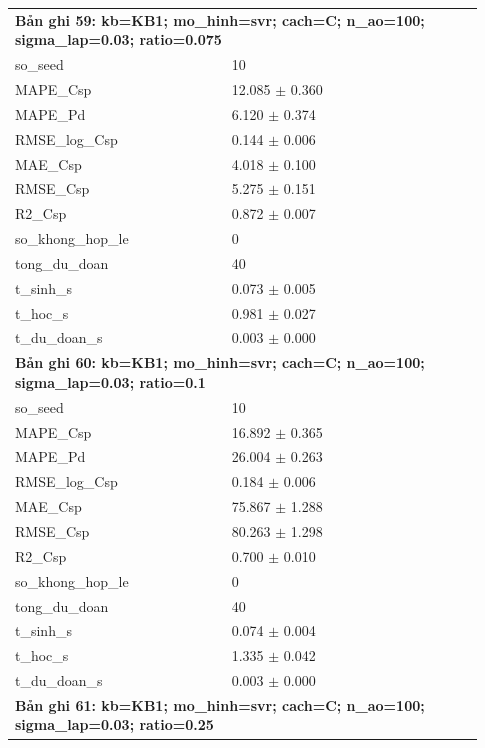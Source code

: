\begin{longtable}{p{0.43\linewidth}p{0.50\linewidth}}
\midrule
\multicolumn{2}{p{0.95\linewidth}}{\textbf{Bản ghi 59: kb=KB1; mo\_hinh=svr; cach=C; n\_ao=100; sigma\_lap=0.03; ratio=0.075}} \\
so\_\allowbreak seed & 10 \\
MAPE\_\allowbreak Csp & 12.085 $\pm$ 0.360 \\
MAPE\_\allowbreak Pd & 6.120 $\pm$ 0.374 \\
RMSE\_\allowbreak log\_\allowbreak Csp & 0.144 $\pm$ 0.006 \\
MAE\_\allowbreak Csp & 4.018 $\pm$ 0.100 \\
RMSE\_\allowbreak Csp & 5.275 $\pm$ 0.151 \\
R2\_\allowbreak Csp & 0.872 $\pm$ 0.007 \\
so\_\allowbreak khong\_\allowbreak hop\_\allowbreak le & 0 \\
tong\_\allowbreak du\_\allowbreak doan & 40 \\
t\_\allowbreak sinh\_\allowbreak s & 0.073 $\pm$ 0.005 \\
t\_\allowbreak hoc\_\allowbreak s & 0.981 $\pm$ 0.027 \\
t\_\allowbreak du\_\allowbreak doan\_\allowbreak s & 0.003 $\pm$ 0.000 \\
\midrule
\multicolumn{2}{p{0.95\linewidth}}{\textbf{Bản ghi 60: kb=KB1; mo\_hinh=svr; cach=C; n\_ao=100; sigma\_lap=0.03; ratio=0.1}} \\
so\_\allowbreak seed & 10 \\
MAPE\_\allowbreak Csp & 16.892 $\pm$ 0.365 \\
MAPE\_\allowbreak Pd & 26.004 $\pm$ 0.263 \\
RMSE\_\allowbreak log\_\allowbreak Csp & 0.184 $\pm$ 0.006 \\
MAE\_\allowbreak Csp & 75.867 $\pm$ 1.288 \\
RMSE\_\allowbreak Csp & 80.263 $\pm$ 1.298 \\
R2\_\allowbreak Csp & 0.700 $\pm$ 0.010 \\
so\_\allowbreak khong\_\allowbreak hop\_\allowbreak le & 0 \\
tong\_\allowbreak du\_\allowbreak doan & 40 \\
t\_\allowbreak sinh\_\allowbreak s & 0.074 $\pm$ 0.004 \\
t\_\allowbreak hoc\_\allowbreak s & 1.335 $\pm$ 0.042 \\
t\_\allowbreak du\_\allowbreak doan\_\allowbreak s & 0.003 $\pm$ 0.000 \\
\midrule
\multicolumn{2}{p{0.95\linewidth}}{\textbf{Bản ghi 61: kb=KB1; mo\_hinh=svr; cach=C; n\_ao=100; sigma\_lap=0.03; ratio=0.25}} \\

\end{longtable}
